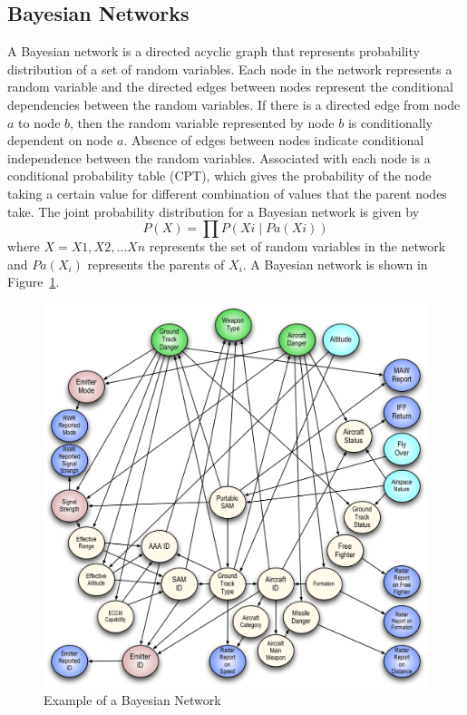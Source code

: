 \documentclass[12pt,a4paper]{article}
\begin{document}
\subsection{Bayesian Networks}
A Bayesian network is a directed acyclic graph that represents
probability distribution of a set of random variables. Each node in
the network represents a random variable and the directed edges
between nodes represent the conditional dependencies between the
random variables. If there is a directed edge from node $a$ to node
$b$, then the random variable represented by node $b$ is conditionally
dependent on node $a$. Absence of edges between nodes indicate
conditional independence between the random variables. Associated with
each node is a conditional probability table (CPT), which gives the
probability of the node taking a certain value for different
combination of values that the parent nodes take. The joint
probability distribution for a Bayesian network is given by
\[ P(X) = \prod P(Xi \mid Pa(Xi)) \]
%
where $X = X1,X2, \ldots Xn$ represents the set of random variables in
the network and $Pa(X_i)$ represents the parents of $X_i$. A Bayesian
network is shown in Figure~\ref{fig:bayes}.
\begin{figure}[H]
  \centering
  \includegraphics[scale=.25]{image.jpg}
  \caption{Example of a Bayesian Network}
  \label{fig:bayes}
\end{figure}
\end{document}
